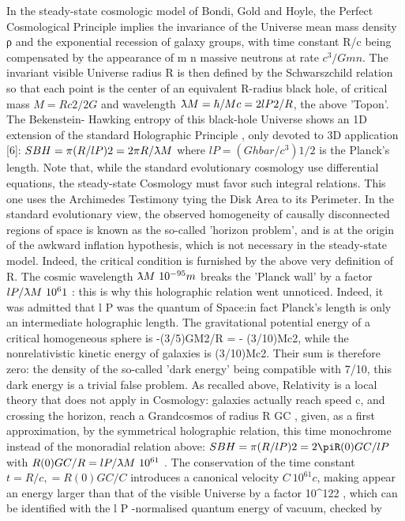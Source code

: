 In the steady-state cosmologic model of Bondi, Gold and Hoyle, the Perfect Cosmological
Principle implies the invariance of the Universe mean mass density ρ and the exponential recession
of galaxy groups, with time constant R/c being compensated by the appearance of m n massive
neutrons at rate $c^3 /Gm n $. The invariant visible Universe radius R is then defined by the
Schwarszchild relation so that each point is the center of an equivalent R-radius black hole, of
critical mass $M = Rc 2 /2G$ and wavelength $\lambdabar M = \hbar/Mc = 2l P2 /R$, the above 'Topon'. The Bekenstein-
Hawking entropy of this black-hole Universe shows an 1D extension of the standard Holographic
Principle , only devoted to 3D application [6]:
$S BH = \pi(R/l P )2 = 2\pi R/\lambdabar M$
where $l P = (Ghbar/c^3 ) 1/2$ is the Planck's length. Note that, while the standard evolutionary cosmology
use differential equations, the steady-state Cosmology must favor such integral relations. This one
uses the Archimedes Testimony tying the Disk Area to its Perimeter.
In the standard evolutionary view, the observed homogeneity of causally disconnected regions
of space is known as the so-called 'horizon problem', and is at the origin of the awkward inflation
hypothesis, which is not necessary in the steady-state model. Indeed, the critical condition is
furnished by the above very definition of R.
The cosmic wavelength $\lambdabar M ~ 10^{-95} m$ breaks the 'Planck wall' by a factor $l P /\lambdabar M ~ 10^61$ : this is why
this holographic relation went unnoticed. Indeed, it was admitted that l P was the quantum of Space:in fact Planck's length is only an intermediate holographic length.
The gravitational potential energy of a critical homogeneous sphere is -(3/5)GM2/R = -
(3/10)Mc2, while the nonrelativistic kinetic energy of galaxies is (3/10)Mc2. Their sum is therefore
zero: the density of the so-called 'dark energy' being compatible with 7/10, this dark energy is a
trivial false problem. As recalled above, Relativity is a local theory that does not apply in
Cosmology: galaxies actually reach speed c, and crossing the horizon, reach a Grandcosmos of
radius R GC , given, as a first approximation, by the symmetrical holographic relation, this time
monochrome instead of the monoradial relation above:
$S BH = \pi(R/l P )2 = 2\piR (0) GC /l P$
with $R (0) GC /R = l P /\lambdabar M ~ 10^{61}$ . The conservation of the time constant $t = R/c, = R (0) GC /C$ introduces a
canonical velocity $C ~ 10^{61} c$, making appear an energy larger than that of the visible Universe by a
factor 10^122 , which can be identified with the l P -normalised quantum energy of vacuum, checked by
